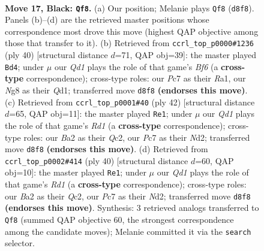 \documentclass[11pt]{article}
\begin{document}
\clearpage

\begin{figure}[p]\centering
\begin{subfigure}{0.46\textwidth}\centering
\resizebox{\linewidth}{!}{%
\newchessgame
\chessboard[
  setfen={2kq2nr/p1p2ppp/1pp5/8/8/2P2P2/bP1Q2PP/2K2B1R b - - 1 17},
  showmover=false,
  pgfstyle=straightmove, color=movearrow, markmove={d8-f8}
]}
\caption{}
\end{subfigure}\hfill
\begin{subfigure}{0.46\textwidth}\centering
\resizebox{\linewidth}{!}{%
\newchessgame
\chessboard[
  setfen={r5k1/2p4p/p2p1Bb1/1q1n4/8/3N4/PPP3PP/R2Q2K1 w - - 1 21},
  showmover=false,
  pgfstyle=straightmove, color=movearrow, markmove={f6-d4}
]}
\caption{}
\end{subfigure}
\\[4pt]
\begin{subfigure}{0.46\textwidth}\centering
\resizebox{\linewidth}{!}{%
\newchessgame
\chessboard[
  setfen={4r1k1/pp2qpp1/n1p4p/8/5P1P/2P3P1/P1QNbPB1/3R2K1 w - - 1 22},
  showmover=false,
  pgfstyle=straightmove, color=movearrow, markmove={d1-e1}
]}
\caption{}
\end{subfigure}\hfill
\begin{subfigure}{0.46\textwidth}\centering
\resizebox{\linewidth}{!}{%
\newchessgame
\chessboard[
  setfen={4r1k1/pp2qppp/n1p5/8/5P2/2P3P1/P1QNbPBP/3R2K1 w - - 1 21},
  showmover=false,
  pgfstyle=straightmove, color=movearrow, markmove={d1-e1}
]}
\caption{}
\end{subfigure}
\caption{\textbf{Move 17, Black: \texttt{Qf8}.} (a) Our position; Melanie plays \texttt{Qf8} (\texttt{d8f8}). Panels (b)--(d) are the retrieved master positions whose correspondence most drove this move (highest QAP objective among those that transfer to it). (b) Retrieved from \texttt{ccrl\_top\_p0000\#1236} (ply 40) [structural distance $d$=71, QAP obj=39]: the master played \texttt{Bd4}; under $\mu$ our \emph{Qd1} plays the role of that game's \emph{Bf6} (a \textbf{cross-type} correspondence); cross-type roles: our \emph{P}c7 as their \emph{R}a1, our \emph{N}g8 as their \emph{Q}d1; transferred move \texttt{d8f8} \textbf{(endorses this move)}. (c) Retrieved from \texttt{ccrl\_top\_p0001\#40} (ply 42) [structural distance $d$=65, QAP obj=11]: the master played \texttt{Re1}; under $\mu$ our \emph{Qd1} plays the role of that game's \emph{Rd1} (a \textbf{cross-type} correspondence); cross-type roles: our \emph{B}a2 as their \emph{Q}c2, our \emph{P}c7 as their \emph{N}d2; transferred move \texttt{d8f8} \textbf{(endorses this move)}. (d) Retrieved from \texttt{ccrl\_top\_p0002\#414} (ply 40) [structural distance $d$=60, QAP obj=10]: the master played \texttt{Re1}; under $\mu$ our \emph{Qd1} plays the role of that game's \emph{Rd1} (a \textbf{cross-type} correspondence); cross-type roles: our \emph{B}a2 as their \emph{Q}c2, our \emph{P}c7 as their \emph{N}d2; transferred move \texttt{d8f8} \textbf{(endorses this move)}. Synthesis: 3 retrieved analogs transferred to \texttt{Qf8} (summed QAP objective 60, the strongest correspondence among the candidate moves); Melanie committed it via the \texttt{search} selector.}
\label{fig:thought-m33}
\end{figure}
\end{document}
